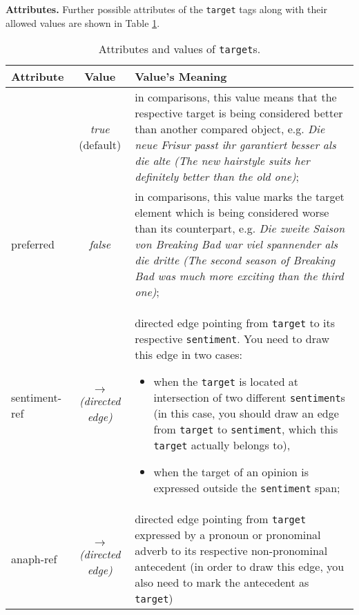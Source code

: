 \documentclass[11pt,a4paper]{article}
\newlength{\clmnwidth}
\theoremstyle{mytheoremstyle}
\begin{document}
\noindent\textbf{Attributes.} Further possible attributes of the
\texttt{target} tags along with their allowed values are shown in
Table \ref{tbl:target}.
\begin{center}
  \begin{table}[h]
    \caption{Attributes and values of \texttt{target}s.}
    \begin{tabular}{|l|c|p{0.94\clmnwidth}|}\hline
      Attribute & Value & Value's Meaning\\\hline

      & \textit{true} (default) & in comparisons, this value means that
      the respective target is being considered better than another
      compared object, e.g. \textit{\emph{Die neue Frisur} passt ihr
        garantiert besser als die alte (\emph{The new hairstyle} suits
        her definitely better than the old one)};\\\cline{2-3}

      \multirow{-2}{*}{preferred} & \textit{false} & in comparisons,
      this value marks the target element which is being considered
      worse than its counterpart, e.g. \textit{Die zweite Saison von
        Breaking Bad war viel spannender als \emph{die dritte} (The
        second season of Breaking Bad was much more exciting than
        \emph{the third one})};\\\hline

      sentiment-ref & \textit{$\longrightarrow$\newline(directed
        edge)} & directed edge pointing from \texttt{target} to its
      respective \texttt{sentiment}.  You need to draw this edge in
      two cases:
      \begin{itemize}
      \item when the \texttt{target} is located at intersection of two
        different \texttt{sentiment}s (in this case, you should draw
        an edge from \texttt{target} to \texttt{sentiment}, which this
        \texttt{target} actually belongs to),

      \item when the target of an opinion is expressed outside the
        \texttt{sentiment} span;
      \end{itemize}\\\hline

      anaph-ref & \textit{$\longrightarrow$\newline(directed edge)} &
      directed edge pointing from \texttt{target} expressed by a
      pronoun or pronominal adverb to its respective non-pronominal
      antecedent (in order to draw this edge, you also need to mark
      the antecedent as \texttt{target})\\\hline
    \end{tabular}
    \label{tbl:target}
  \end{table}
\end{center}
\end{document}
